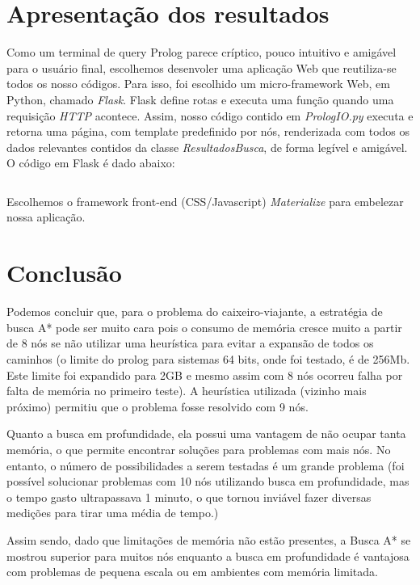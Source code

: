 \documentclass[12pt,a4paper]{article}
\begin{document}
  \section{Apresentação dos resultados}
  Como um terminal de query Prolog parece críptico, pouco intuitivo e amigável para o usuário final, escolhemos desenvoler uma aplicação Web que reutiliza-se todos os nosso códigos. Para isso, foi escolhido um micro-framework Web, em Python, chamado \emph{Flask}. Flask define rotas e executa uma função quando uma requisição \emph{HTTP} acontece. Assim, nosso código contido em \emph{PrologIO.py} executa e retorna uma página, com template predefinido por nós, renderizada com todos os dados relevantes contidos da classe \emph{ResultadosBusca}, de forma legível e amigável. O código em Flask é dado abaixo:
  \begin{mdframed}[linecolor=black, topline=true, bottomline=true,leftline=false, rightline=false, backgroundcolor=yellow!10!white]
\inputminted[tabsize=2,linenos=true,fontsize=\footnotesize,breaklines=true,breakafter=format]{python}{../tspserver.py}
\end{mdframed}

Escolhemos o framework front-end (CSS/Javascript) \emph{Materialize} para embelezar nossa aplicação.

\section{Conclusão}
	Podemos concluir que, para o problema do caixeiro-viajante, a estratégia de busca A* pode ser muito cara pois o consumo de memória cresce muito a partir de 8 nós se não utilizar uma heurística para evitar a expansão de todos os caminhos (o limite do prolog para sistemas 64 bits, onde foi testado, é de 256Mb. Este limite foi expandido para 2GB e mesmo assim com 8 nós ocorreu falha por falta de memória no primeiro teste). A heurística utilizada (vizinho mais próximo) permitiu que o problema fosse resolvido com 9 nós.

	Quanto a busca em profundidade, ela possui uma vantagem de não ocupar tanta memória, o que permite encontrar soluções para problemas com mais nós. No entanto, o número de possibilidades a serem testadas é um grande problema (foi possível solucionar problemas com 10 nós utilizando busca em profundidade, mas o tempo gasto ultrapassava 1 minuto, o que tornou inviável fazer diversas medições para tirar uma média de tempo.)

  Assim sendo, dado que limitações de memória não estão presentes, a Busca A* se mostrou superior para muitos nós enquanto a busca em profundidade é vantajosa com problemas de pequena escala ou em ambientes com memória limitada.
\end{document}
